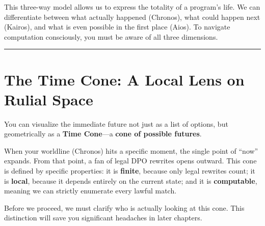 This three-way model allows us to express the totality of a program's life. We can differentiate between what actually happened (Chronos), what could happen next (Kairos), and what is even possible in the first place (Aios). To navigate computation consciously, you must be aware of all three dimensions.

\begin{center}
\rule{0.5\linewidth}{0.5pt}
\end{center}

\section{The Time Cone: A Local Lens on Rulial Space}
\label{the-time-cube-a-local-lens-on-rulial-space}

You can visualize the immediate future not just as a list of options, but geometrically as a \textbf{Time Cone}—a \textbf{cone of possible futures}.

When your worldline (Chronos) hits a specific moment, the single point of ``now'' expands. From that point, a fan of legal DPO rewrites opens outward. This cone is defined by specific properties: it is \textbf{finite}, because only legal rewrites count; it is \textbf{local}, because it depends entirely on the current state; and it is \textbf{computable}, meaning we can strictly enumerate every lawful match.

Before we proceed, we must clarify who is actually looking at this cone. This distinction will save you significant headaches in later chapters.

\vspace{0.5cm}
\begin{center}
\end{center}
\vspace{0.5cm}


